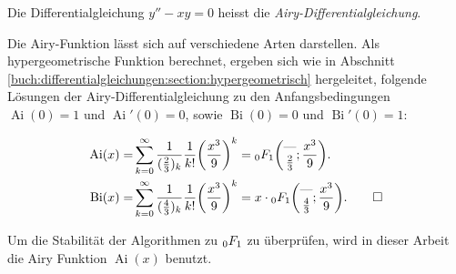 \begin{definition}
    \label{0f1:airy:differentialgleichung:def}
    Die Differentialgleichung
    $y'' - xy = 0$
    heisst die {\em Airy-Differentialgleichung}.
\end{definition}

Die Airy-Funktion lässt sich auf verschiedene Arten darstellen. 
Als hypergeometrische Funktion berechnet, ergeben sich wie in Abschnitt \ref{buch:differentialgleichungen:section:hypergeometrisch} hergeleitet, folgende Lösungen der Airy-Differentialgleichung zu den Anfangsbedingungen $\operatorname{Ai}(0)=1$ und $\operatorname{Ai}'(0)=0$, sowie $\operatorname{Bi}(0)=0$ und $\operatorname{Bi}'(0)=1$:

\begin{align}
\label{0f1:airy:hypergeometrisch:eq}
\operatorname{Ai}(x)
=&
\sum_{k=0}^\infty
\frac{1}{(\frac23)_k} \frac{1}{k!}\biggl(\frac{x^3}{9}\biggr)^k
=
\mathstrut_0F_1\biggl(
\begin{matrix}\text{---}\\\frac23\end{matrix};\frac{x^3}{9}
\biggr).
\\
\operatorname{Bi}(x)
=&
\sum_{k=0}^\infty
\frac{1}{(\frac43)_k} \frac{1}{k!}\biggl(\frac{x^3}{9}\biggr)^k
=
x\cdot\mathstrut_0F_1\biggl(
\begin{matrix}\text{---}\\\frac43\end{matrix};
\frac{x^3}{9}
\biggr).
\qedhere
\end{align}

Um die Stabilität der Algorithmen zu $\mathstrut_0F_1$ zu überprüfen, wird in dieser Arbeit die Airy Funktion $\operatorname{Ai}(x)$ benutzt.


